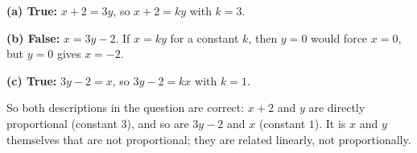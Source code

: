 \textbf{(a) True:} $x+2=3y$, so $x+2=ky$ with $k=3$.

\textbf{(b) False:} $x=3y-2$. If $x=ky$ for a constant $k$, then $y=0$ would force $x=0$, but $y=0$ gives $x=-2$.

\textbf{(c) True:} $3y-2=x$, so $3y-2=kx$ with $k=1$.

So both descriptions in the question are correct: $x+2$ and $y$ are directly proportional (constant $3$), and so are $3y-2$ and $x$ (constant $1$). It is $x$ and $y$ themselves that are not proportional; they are related linearly, not proportionally.

